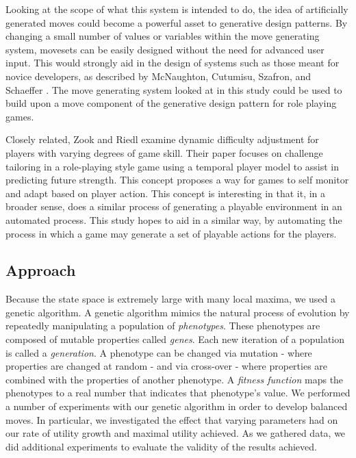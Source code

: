 \documentclass{acm_proc_article-sp}
\begin{document}
Looking at the scope of what this system is intended to do, the idea of artificially generated moves could become a powerful asset to generative design patterns. By changing a small number of values or variables within the move generating system, movesets can be easily designed without the need for advanced user input. This would strongly aid in the design of systems such as those meant for novice developers, as described by McNaughton, Cutumisu, Szafron, and Schaeffer \cite{generative_design_patterns}. The move generating system looked at in this study could be used to build upon a move component of the generative design pattern for role playing games.

Closely related, Zook and Riedl \cite{dynamic_difficulty} examine dynamic difficulty adjustment for players with varying degrees of game skill. Their paper focuses on challenge tailoring in a role-playing style game using a temporal player model to assist in predicting future strength. This concept proposes a way for games to self monitor and adapt based on player action. This concept is interesting in that it, in a broader sense, does a similar process of generating a playable environment in an automated process. This study hopes to aid in a similar way, by automating the process in which a game may generate a set of playable actions for the players.

\subsection{Approach}

Because the state space is extremely large with many local maxima, we used a genetic algorithm. A genetic algorithm mimics the natural process of evolution by repeatedly manipulating a population of \textit{phenotypes}. These phenotypes are composed of mutable properties called \textit{genes}. Each new iteration of a population is called a \textit{generation}. A phenotype can be changed via mutation - where properties are changed at random - and via cross-over - where properties are combined with the properties of another phenotype. A \textit{fitness function} maps the phenotypes to a real number that indicates that phenotype’s value. 
We performed a number of experiments with our genetic algorithm in order to develop balanced moves. In particular, we investigated the effect that varying parameters had on our rate of utility growth and maximal utility achieved. As we gathered data, we did additional experiments to evaluate the validity of the results achieved.
\end{document}
